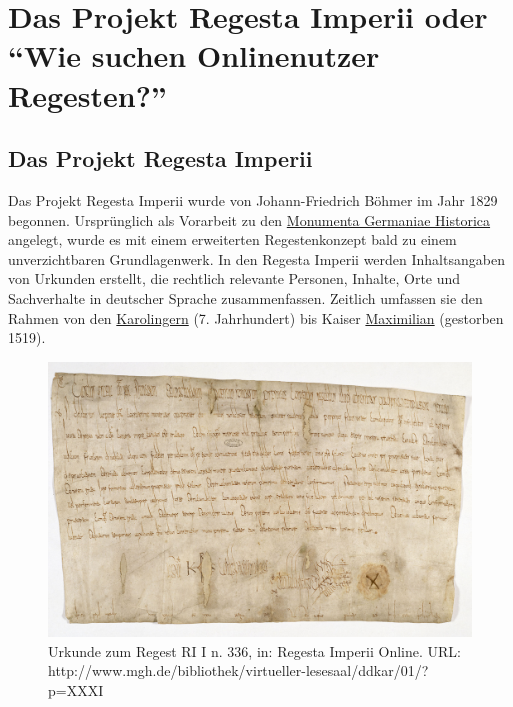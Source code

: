 \documentclass[ngerman,]{scrreprt}
\begin{document}
\hypertarget{das-projekt-regesta-imperii-oder-wie-suchen-onlinenutzer-regesten}{%
\chapter{Das Projekt Regesta Imperii oder ``Wie suchen Onlinenutzer Regesten?''}\label{das-projekt-regesta-imperii-oder-wie-suchen-onlinenutzer-regesten}}

\hypertarget{das-projekt-regesta-imperii}{%
\section{Das Projekt Regesta Imperii}\label{das-projekt-regesta-imperii}}

Das Projekt Regesta Imperii wurde von Johann-Friedrich Böhmer im Jahr 1829 begonnen. Ursprünglich als Vorarbeit zu den \href{https://www.mgh.de}{Monumenta Germaniae Historica} angelegt, wurde es mit einem erweiterten Regestenkonzept bald zu einem unverzichtbaren Grundlagenwerk. In den Regesta Imperii werden Inhaltsangaben von Urkunden erstellt, die rechtlich relevante Personen, Inhalte, Orte und Sachverhalte in deutscher Sprache zusammenfassen. Zeitlich umfassen sie den Rahmen von den \href{https://de.wikipedia.org/wiki/Karolinger}{Karolingern} (7. Jahrhundert) bis Kaiser \href{https://de.wikipedia.org/wiki/Maximilian_I._(HRR)}{Maximilian} (gestorben 1519).

\begin{figure}
\centering
\includegraphics{Bilder/Beispielurkunde.jpg}
\caption{Urkunde zum Regest RI I n. 336, in: Regesta Imperii Online. URL: http://www.mgh.de/bibliothek/virtueller-lesesaal/ddkar/01/?p=XXXI}
\label{urkunde}
\end{figure}
\end{document}
